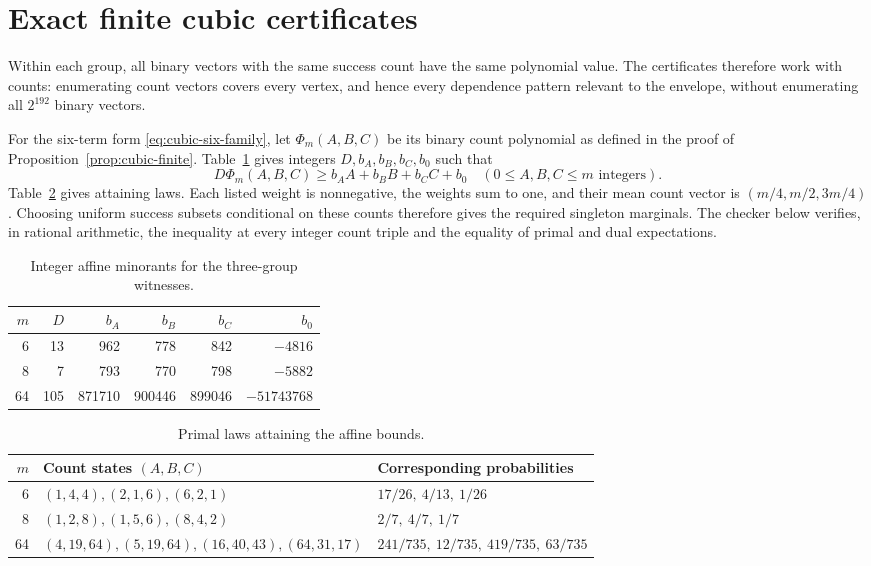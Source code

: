 \section{Exact finite cubic certificates}\label{app:cubic-certificates}
Within each group, all binary vectors with the same success count have
the same polynomial value. The certificates therefore work with counts:
enumerating count vectors covers every vertex, and hence every
dependence pattern relevant to the envelope, without enumerating all
$2^{192}$ binary vectors.

For the six-term form \eqref{eq:cubic-six-family}, let
$\Phi_m(A,B,C)$ be its binary count polynomial as defined in the proof of
Proposition~\ref{prop:cubic-finite}. Table~\ref{tab:cubic-duals} gives
integers $D,b_A,b_B,b_C,b_0$ such that
\begin{equation}\label{eq:cubic-integer-dual}
 D\Phi_m(A,B,C)\ge b_AA+b_BB+b_CC+b_0
       \quad(0\le A,B,C\le m\text{ integers}).
\end{equation}
Table~\ref{tab:cubic-primals} gives attaining laws. Each listed weight is
nonnegative, the weights sum to one, and their mean count vector is
$(m/4,m/2,3m/4)$. Choosing uniform success subsets conditional on these
counts therefore gives the required singleton marginals. The checker
below verifies, in rational arithmetic, the inequality at every integer
count triple and the equality of primal and dual expectations.

\begin{table}[htbp]
\centering
\begin{tabular}{rrrrrr}
\toprule
$m$&$D$&$b_A$&$b_B$&$b_C$&$b_0$\\\midrule
6&13&962&778&842&$-4816$\\
8&7&793&770&798&$-5882$\\
64&105&871710&900446&899046&$-51743768$\\\bottomrule
\end{tabular}
\caption{Integer affine minorants for the three-group witnesses.}
\label{tab:cubic-duals}
\end{table}

\begin{table}[htbp]
\centering
\begin{tabular}{rll}
\toprule
$m$&Count states $(A,B,C)$&Corresponding probabilities\\\midrule
6&$(1,4,4),(2,1,6),(6,2,1)$&$17/26,\ 4/13,\ 1/26$\\
8&$(1,2,8),(1,5,6),(8,4,2)$&$2/7,\ 4/7,\ 1/7$\\
64&$(4,19,64),(5,19,64),(16,40,43),(64,31,17)$
 &$241/735,\ 12/735,\ 419/735,\ 63/735$\\\bottomrule
\end{tabular}
\caption{Primal laws attaining the affine bounds.}
\label{tab:cubic-primals}
\end{table}

